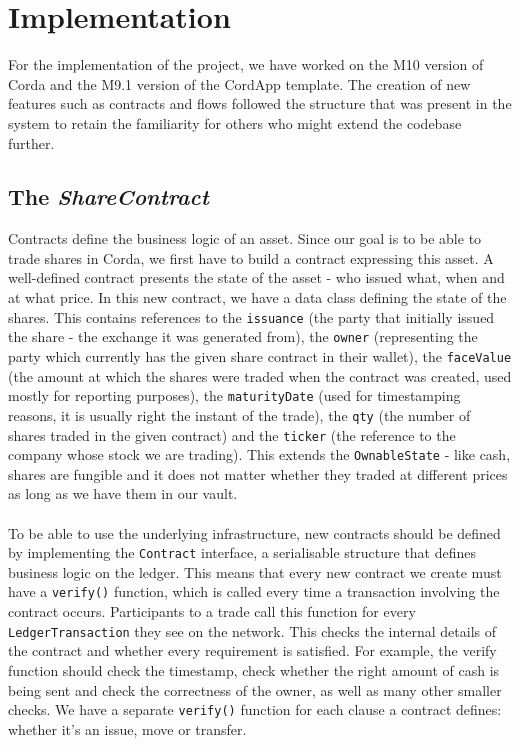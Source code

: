 \documentclass[12pt,twoside]{article}
\begin{document}
\section{Implementation}
\label{sec:DesignImplementation}
For the implementation of the project, we have worked on the M10 version of Corda and the M9.1 version of the CordApp template. The creation of new features such as contracts and flows followed the structure that was present in the system to retain the familiarity for others who might extend the codebase further. 
\subsection{The \textit{ShareContract}}
\label{sub:Contract}
Contracts define the business logic of an asset. Since our goal is to be able to trade shares in Corda, we first have to build a contract expressing this asset. A well-defined contract presents the state of the asset - who issued what, when and at what price. In this new contract, we have a data class defining the state of the shares. This contains references to the \verb|issuance| (the party that initially issued the share - the exchange it was generated from), the \verb|owner| (representing the party which currently has the given share contract in their wallet), the \verb|faceValue| (the amount at which the shares were traded when the contract was created, used mostly for reporting purposes), the \verb|maturityDate| (used for timestamping reasons, it is usually right the instant of the trade), the \verb|qty| (the number of shares traded in the given contract) and the \verb|ticker| (the reference to the company whose stock we are trading). This extends the \verb|OwnableState| - like cash, shares are fungible and it does not matter whether they traded at different prices as long as we have them in our vault.
\\ \\
To be able to use the underlying infrastructure, new contracts should be defined by implementing the \verb|Contract| interface, a serialisable structure that defines business logic on the ledger. This means that every new contract we create must have a \verb|verify()| function, which is called every time a transaction involving the contract occurs. Participants to a trade call this function for every \verb|LedgerTransaction| they see on the network. This checks the internal details of the contract and whether every requirement is satisfied. For example, the verify function should check the timestamp, check whether the right amount of cash is being sent and check the correctness of the owner, as well as many other smaller checks. We have a separate \verb|verify()| function for each clause a contract defines: whether it's an issue, move or transfer.
\end{document}
